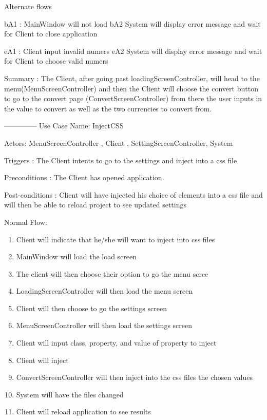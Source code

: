 \documentclass[12pt]{article}
\begin{document}
\begin{enumerate}
Alternate flows

bA1 : MainWindow will not load
\newline bA2 System will display error message and wait for Client to close application

eA1 : Client input invalid numers
\newline eA2 System will display error message and wait for Client to choose valid numers

Summary : The Client, after going past loadingScreenController, will head to the menu(MenuScreenController) and then the Client will choose the convert button to go to the convert page (ConvertScreenController) from there the user inputs in the value to convert as well as the two currencies to convert from.



\subitem --------------
\newline Use Case Name: InjectCSS

Actors: MenuScreenController , Client , SettingScreenController, System

Triggers : The Client intents to go to the settings and inject into a css file

Preconditions : The Client has opened application.

Post-conditions : Client will have injected his choice of elements into a css file and will then be able to reload project to see updated settings

Normal Flow:

\begin{enumerate}
	\item Client will indicate that he/she will want to inject into css files
	\item MainWindow will load the load screen
	\item The client will then choose their option to go the menu scree
	\item LoadingScreenController will then load the menu screen
	\item Client will then choose to go the settings screen
	\item MenuScreenController will then load the settings screen
	\item Client will input class, property, and value of property to inject 
	\item Client will inject 
	\item ConvertScreenController will then inject into the css files the chosen values
	\item System will have the files changed
	\item Client will reload application to see results
\end{enumerate}


\end{enumerate}
\end{document}

